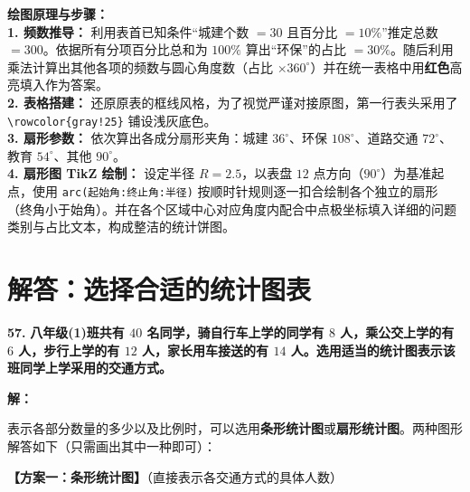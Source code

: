 \vspace{0.4cm}
{\small\color{blue!70!black}
\textbf{绘图原理与步骤：}\\
\textbf{1. 频数推导：} 利用表首已知条件“城建个数 $= 30$ 且百分比 $= 10\%$”推定总数 $= 300$。依据所有分项百分比总和为 $100\%$ 算出“环保”的占比 $= 30\%$。随后利用乘法计算出其他各项的频数与圆心角度数（占比 $\times 360^\circ$）并在统一表格中用\textbf{红色}高亮填入作为答案。\\
\textbf{2. 表格搭建：} 还原原表的框线风格，为了视觉严谨对接原图，第一行表头采用了 \texttt{\textbackslash{}rowcolor\{gray!25\}} 铺设浅灰底色。\\
\textbf{3. 扇形参数：} 依次算出各成分扇形夹角：城建 $36^\circ$、环保 $108^\circ$、道路交通 $72^\circ$、教育 $54^\circ$、其他 $90^\circ$。\\
\textbf{4. 扇形图 TikZ 绘制：} 设定半径 $R=2.5$，以表盘 $12$ 点方向（$90^\circ$）为基准起点，使用 \texttt{arc(起始角:终止角:半径)} 按顺时针规则逐一扣合绘制各个独立的扇形（终角小于始角）。并在各个区域中心对应角度内配合中点极坐标填入详细的问题类别与占比文本，构成整洁的统计饼图。
}

\newpage



\section{解答：选择合适的统计图表}

\vspace{0.6cm}

\textbf{\LARGE 57.} \textbf{八年级(1)班共有 $40$ 名同学，骑自行车上学的同学有 $8$ 人，乘公交上学的有 $6$ 人，步行上学的有 $12$ 人，家长用车接送的有 $14$ 人。选用适当的统计图表示该班同学上学采用的交通方式。}

\vspace{0.4cm}
\textbf{解：}

表示各部分数量的多少以及比例时，可以选用\textbf{条形统计图}或\textbf{扇形统计图}。两种图形解答如下（只需画出其中一种即可）：

\vspace{0.4cm}
\textbf{【方案一：条形统计图】}（直接表示各交通方式的具体人数）

